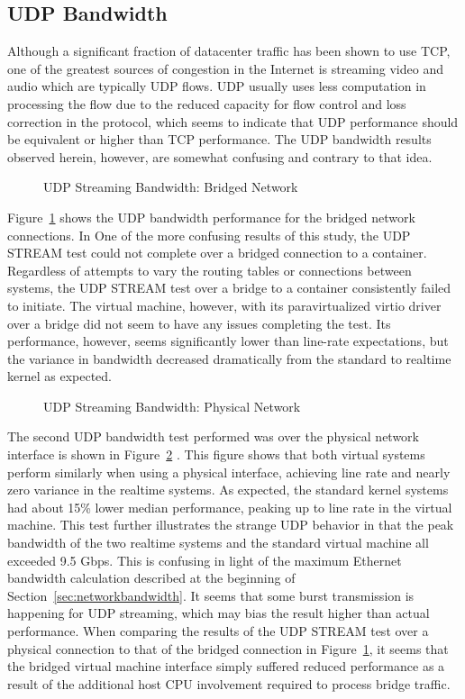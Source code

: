 \subsection{UDP Bandwidth} %
\label{sub:udpbandwidth}
Although a significant fraction of datacenter traffic has been shown to use TCP, one of the greatest sources of congestion in the Internet is streaming video and audio which are typically UDP flows.
UDP usually uses less computation in processing the flow due to the reduced capacity for flow control and loss correction in the protocol, which seems to indicate that UDP performance should be equivalent or higher than TCP performance.  
The UDP bandwidth results observed herein, however, are somewhat confusing and contrary to that idea.

\begin{figure}
    \centering
    \def\svgwidth{\columnwidth}
    
    \caption{UDP Streaming Bandwidth: Bridged Network}
    \label{fig:udp_stream_bridge}
\end{figure}
Figure~\ref{fig:udp_stream_bridge} shows the UDP bandwidth performance for the bridged network connections.  
In One of the more confusing results of this study, the UDP STREAM test could not complete over a bridged connection to a container.
Regardless of attempts to vary the routing tables or connections between systems, the UDP STREAM test over a bridge to a container consistently failed to initiate.
The virtual machine, however, with its paravirtualized virtio driver over a bridge did not seem to have any issues completing the test.  
Its performance, however, seems significantly lower than line-rate expectations, but the variance in bandwidth decreased dramatically from the standard to realtime kernel as expected.  

\begin{figure}
    \centering
    \def\svgwidth{\columnwidth}
    
    \caption{UDP Streaming Bandwidth: Physical Network}
    \label{fig:udp_stream_phys}
\end{figure}

The second UDP bandwidth test performed was over the physical network interface is shown in Figure~\ref{fig:udp_stream_phys} .  
This figure shows that both virtual systems perform similarly when using a physical interface, achieving line rate and nearly zero variance in the realtime systems.
As expected, the standard kernel systems had about 15\% lower median performance, peaking up to line rate in the virtual machine.
This test further illustrates the strange UDP behavior in that the peak bandwidth of the two realtime systems and the standard virtual machine all exceeded 9.5 Gbps. 
This is confusing in light of the maximum Ethernet bandwidth calculation described at the beginning of Section~\ref{sec:networkbandwidth}.
It seems that some burst transmission is happening for UDP streaming, which may bias the result higher than actual performance.
When comparing the results of the UDP STREAM test over a physical connection to that of the bridged connection in Figure~\ref{fig:udp_stream_bridge}, it seems that the bridged virtual machine interface simply suffered reduced performance as a result of the additional host CPU involvement required to process bridge traffic.

